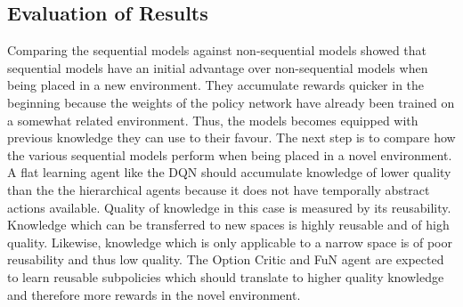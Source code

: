 \documentclass[notitlepage,a4paper,11pt]{article}
\begin{document}
\subsection{Evaluation of Results}
Comparing the sequential models against non-sequential models showed that sequential models have an initial advantage over non-sequential models when being placed in a new environment. They accumulate rewards quicker in the beginning because the weights of the policy network have already been trained on a somewhat related environment. Thus, the models becomes equipped with previous knowledge they can use to their favour. The next step is to compare how the various sequential models perform when being placed in a novel environment. A flat learning agent like the DQN should accumulate knowledge of lower quality than the the hierarchical agents because it does not have temporally abstract actions available. Quality of knowledge in this case is measured by its reusability. Knowledge which can be transferred to new spaces is highly reusable and of high quality. Likewise, knowledge which is only applicable to a narrow space is of poor reusability and thus low quality. The Option Critic and FuN agent are expected to learn reusable subpolicies which should translate to higher quality knowledge and therefore more rewards in the novel environment. 
\end{document}
